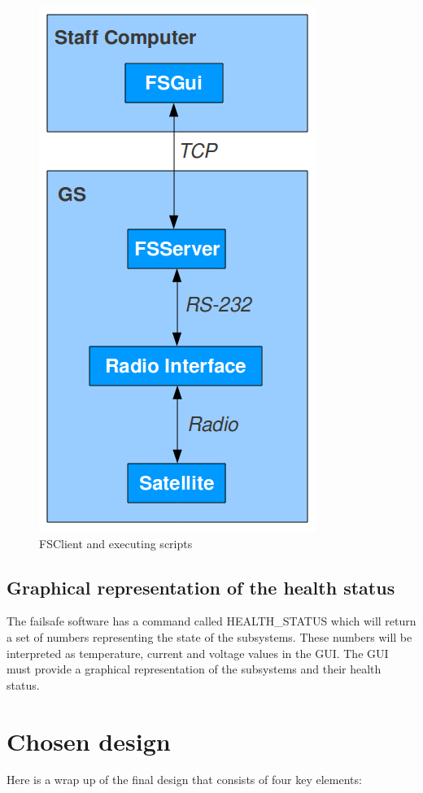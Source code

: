 \begin{figure}[h!] \centering
	\includegraphics[scale=0.5]{img/tcp_interface_to_the_radio}
  \caption{FSClient and executing scripts}
\end{figure}

\subsection{Graphical representation of the health status}
The failsafe software has a command called HEALTH\_STATUS which will return a set of numbers representing the state of the subsystems. These numbers will be interpreted as temperature, current and voltage values in the GUI. The GUI must provide a graphical representation of the subsystems and their health status.

\section{Chosen design}
Here is a wrap up of the final design that consists of four key elements:

